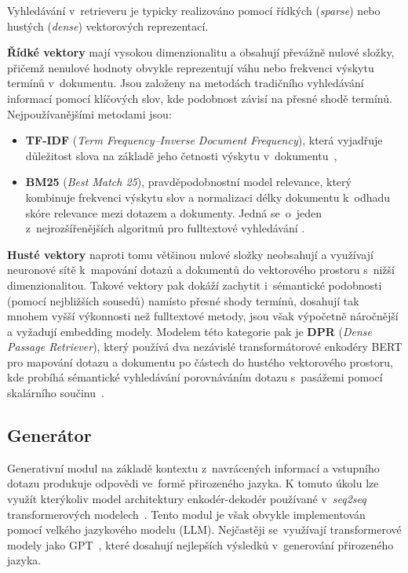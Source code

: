 Vyhledávání v~retrieveru je typicky realizováno pomocí řídkých (\textit{sparse}) nebo hustých (\textit{dense}) vektorových reprezentací. \newpage

\textbf{Řídké vektory} mají vysokou dimenzionalitu a obsahují převážně nulové složky, přičemž nenulové hodnoty obvykle reprezentují váhu nebo frekvenci výskytu termínů v~dokumentu. Jsou založeny na metodách tradičního vyhledávání informací pomocí klíčových slov, kde podobnost závisí na přesné shodě termínů. Nejpoužívanějšími metodami jsou:
\begin{itemize}
    \item \textbf{TF-IDF} (\textit{Term Frequency–Inverse Document Frequency}), která vyjadřuje důležitost slova na základě jeho četnosti výskytu v~dokumentu~\cite{buttcher2010information},
    \item \textbf{BM25} (\textit{Best Match 25}), pravděpodobnostní model relevance, který kombinuje frekvenci výskytu slov a normalizaci délky dokumentu k~odhadu skóre relevance mezi dotazem a dokumenty. Jedná se~o~jeden z~nejrozšířenějších algoritmů pro fulltextové vyhledávání \cite{robertson2009bm25}.
\end{itemize}

\textbf{Husté vektory} naproti tomu většinou nulové složky neobsahují a využívají neuronové sítě k~mapování dotazů a dokumentů do vektorového prostoru s~nižší dimenzionalitou. Takové vektory pak dokáží zachytit i~sémantické podobnosti (pomocí nejbližších sousedů) namísto přesné shody termínů, dosahují tak mnohem vyšší výkonnosti než fulltextové metody, jsou však výpočetně náročnější a vyžadují embedding modely. Modelem této kategorie pak je \textbf{DPR} (\textit{Dense Passage Retriever}), který používá dva nezávislé transformátorové enkodéry BERT pro mapování dotazu a dokumentu po částech do hustého vektorového prostoru, kde probíhá sémantické vyhledávání porovnáváním dotazu s~pasážemi pomocí skalárního součinu~\cite{karpukhin2020dense}.

\subsection{Generátor}
Generativní modul na základě kontextu z~navrácených informací a vstupního dotazu produkuje odpovědi ve~formě přirozeného jazyka. K tomuto úkolu lze využít kterýkoliv model architektury enkodér-dekodér používané v~\textit{seq2seq} transformerových modelech~\cite{murel2024encoderdecoder}. Tento modul je však obvykle implementován pomocí velkého jazykového modelu (LLM). Nejčastěji se~využívají transformerové modely jako GPT~\cite{yenduri2023_gpt_review}, které dosahují nejlepších výsledků v~generování přirozeného jazyka.


